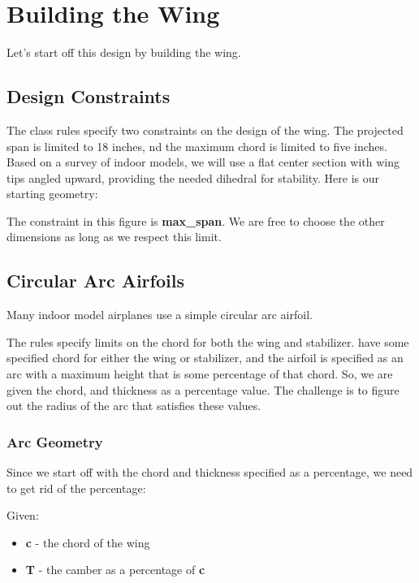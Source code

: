 \section*{Building the Wing}

Let's start off this design by building the wing.

\subsection*{Design Constraints}

The class rules specify two constraints on the design of the wing. The
projected span is limited to 18 inches, nd the maximum chord is limited to five
inches. Based on a survey of indoor models, we will use a flat center section
with wing tips angled upward, providing the needed dihedral for stability. Here
is our starting geometry:



The constraint in this figure is {\bf max\_span}. We are free to choose the
other dimensions as long as we respect this limit.

\subsection*{Circular Arc Airfoils}

Many indoor model airplanes use a simple circular arc airfoil.

The rules specify limits on the chord for both the wing and stabilizer.  have
some specified chord for either the wing or stabilizer, and the airfoil is
specified as an arc with a maximum height that is some percentage of that
chord. So, we are given the chord, and thickness as a percentage value. The
challenge is to figure out the radius of the arc that satisfies these values.

\subsubsection*{Arc Geometry}

Since we start off with the chord and thickness specified as a percentage, we
need to get rid of the percentage:

Given:

\begin{itemize}
  \item{{\bf c} - the chord of the wing}
  \item{{\bf T} - the camber as a percentage of {\bf c}}
\end{itemize}

